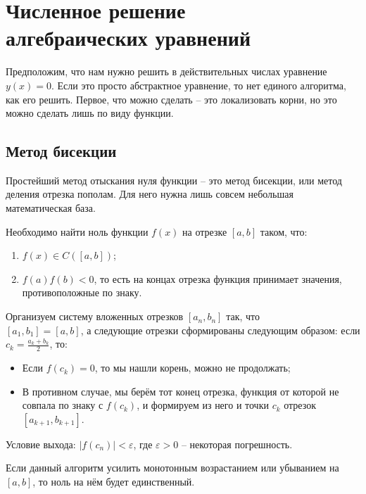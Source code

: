 \documentclass[../main.tex]{subfile}
\begin{document}
\section{Численное решение\\ алгебраических уравнений}

Предположим, что нам нужно решить в действительных числах уравнение
$y(x)=0$. Если это просто абстрактное уравнение, то нет единого
алгоритма, как его решить. Первое, что можно сделать -- это локализовать
корни, но это можно сделать лишь по виду функции.

\subsection{Метод бисекции}

Простейший метод отыскания нуля функции -- это метод бисекции, или метод
деления отрезка пополам. Для него нужна лишь совсем небольшая математическая
база.

\begin{algorithm}\label{eq:bisection_method}
	Необходимо найти ноль функции $f(x)$ на отрезке $[a,b]$ таком, что:
	\begin{enumerate}
		\item $f(x)\in C([a,b])$;
		\item $f(a)f(b)<0$, то есть на концах отрезка функция
			принимает значения, противоположные по знаку.
	\end{enumerate}

	Организуем систему вложенных отрезков $[a_n, b_n]$ так, что\\
	$[a_1, b_1]=[a,b]$, а следующие отрезки сформированы следующим образом:
	если $c_k=\frac{a_k+b_k}{2}$, то:
	\begin{itemize}[noitemsep, nolistsep]
		\item Если $f(c_k)=0$, то мы нашли корень, можно не продолжать;
		\item В противном случае, мы берём тот конец отрезка, функция от
			которой не совпала по знаку с $f(c_k)$, и формируем из
			него и точки $c_k$ отрезок $[a_{k+1},b_{k+1}]$.
	\end{itemize}

	Условие выхода: $|f(c_n)|<\varepsilon$, где $\varepsilon>0$ -- некоторая
	погрешность.

	Если данный алгоритм усилить монотонным возрастанием или убыванием на
	$[a,b]$, то ноль на нём будет единственный.
\end{algorithm}
\end{document}
